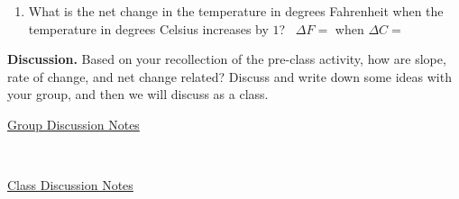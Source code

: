 \documentclass[10pt]{article}
\begin{document}
\begin{enumerate}
\begin{enumerate}
            \,\hfill
            {\Large AROC $=\frac{\Delta F}{\Delta C}=$    }
            \hfill\,\\

        \item[iii.] What is the net change in the temperature in degrees Fahrenheit when the temperature in degrees Celsius increases by $1$?
            \,\hfill
            {\Large $\Delta F=$ when $\Delta C=$   }
            \hfill\,\\
            
        \end{enumerate}
    \end{enumerate}
{\bf\color{blue}Discussion.} Based on your recollection of the pre-class activity, how are slope, rate of change, and net change related? Discuss and write down some ideas with your group, and then we will discuss as a class.\\ 
    \begin{minipage}[t][1.25in]{0.48\textwidth}
    \underline{Group Discussion Notes}
    \end{minipage}
    \,\vline \,
    \begin{minipage}[t][1.25in]{0.48\textwidth}
    \underline{Class Discussion Notes}
    \end{minipage}
    \hfill
\,
\end{document}
